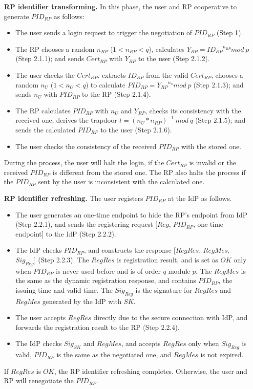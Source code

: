 \vspace{1mm}\noindent\textbf{RP identifier transforming.}
In this phase, the user and RP cooperative to generate $PID_{RP}$ as follows:
\begin{itemize}
  \item The user sends a login request to trigger the negotiation of $PID_{RP}$ (Step 1).
  \item The RP chooses a random $n_{RP}$ ($1 < n_{RP} <q$), calculates $Y_{RP}={ID_{RP}}^{n_{RP}} mod \ p$ (Step 2.1.1); and sends $Cert_{RP}$ with $Y_{RP}$ to the user (Step 2.1.2).
  \item The user checks the $Cert_{RP}$, extracts $ID_{RP}$ from the valid $Cert_{RP}$, chooses a random $n_U$ ($1 < n_U <q$) to calculate $PID_{RP}={Y_{RP}}^{n_{u}} mod \ p$ (Step 2.1.3); and sends $n_U$ with $PID_{RP}$ to the RP (Step 2.1.4).
  \item The RP calculates $PID_{RP}$ with $n_U$ and $Y_{RP}$, checks its consistency with the received one, derives the trapdoor $t={(n_U*n_{RP})}^{-1} \ mod \ q$ (Step 2.1.5); and sends the calculated $PID_{RP}$ to the user (Step 2.1.6).
  \item The user checks the consistency of the received $PID_{RP}$ with the stored one.
\end{itemize}
During the process, the user will halt the login, if  the $Cert_{RP}$ is invalid or the received $PID_{RP}$ is different from the stored one. The RP also halts the process if the $PID_{RP}$ sent by the user is inconsistent with the calculated one. 

\vspace{1mm}\noindent\textbf{RP identifier refreshing.}
The user registers $PID_{RP}$ at the IdP as follows. 
\begin{itemize}
  \item The user generates an one-time endpoint to hide the RP's endpoint from IdP (Step 2.2.1), and sends the registering request [$Reg$, $PID_{RP}$, one-time endpoint] to the IdP (Step 2.2.2).
  \item The IdP checks $PID_{RP}$, and constructs the response [$RegRes$, $RegMes$, $Sig_{Reg}$] (Step 2.2.3). The $RegRes$ is registration result, and is set as $OK$ only when $PID_{RP}$ is never used before and is of order $q$ module $p$. The $RegMes$ is the same as the dynamic registration response, and contains $PID_{RP}$, the issuing time and valid time. The $Sig_{Reg}$ is the signature for $RegRes$ and $RegMes$ generated by the IdP with $SK$.
  \item The user accepts $RegRes$ directly due to the secure connection with IdP, and forwards the registration result to the RP (Step 2.2.4).
  \item The IdP checks $Sig_{SK}$ and $RegMes$, and accepts $RegRes$ only when $Sig_{Reg}$ is valid, $PID_{RP}$ is the same as the negotiated one, and $RegMes$ is not expired.
\end{itemize}
If $RegRes$ is $OK$, the RP identifier refreshing completes. Otherwise, the user and RP will renegotiate the $PID_{RP}$.

